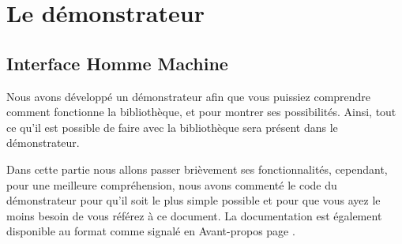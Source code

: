\documentclass[12pt,a4paper,oneside]{book}
\begin{document}
	\maketitle
	\setcounter{tocdepth}{1}
	\setcounter{secnumdepth}{3}
	\frontmatter
	
	\tableofcontents
	\nouveauChapitre
	\newpage
	\mainmatter
	\chapter{Le démonstrateur}
	\section{Interface Homme Machine}
	\nouveauChapitre
	Nous avons développé un démonstrateur afin que vous puissiez comprendre comment fonctionne la bibliothèque, et pour montrer ses possibilités.
	Ainsi, tout ce qu'il est possible de faire avec la bibliothèque sera présent dans le démonstrateur.

	Dans cette partie nous allons passer brièvement ses fonctionnalités, cependant, pour une meilleure
	compréhension, nous avons commenté le code du démonstrateur pour qu'il soit le plus simple possible et pour que vous ayez le moins 
	besoin de vous référez à ce document. La documentation est également disponible au format  comme signalé en Avant-propos page \pageref{docDemonstrateur}.
\end{document}
